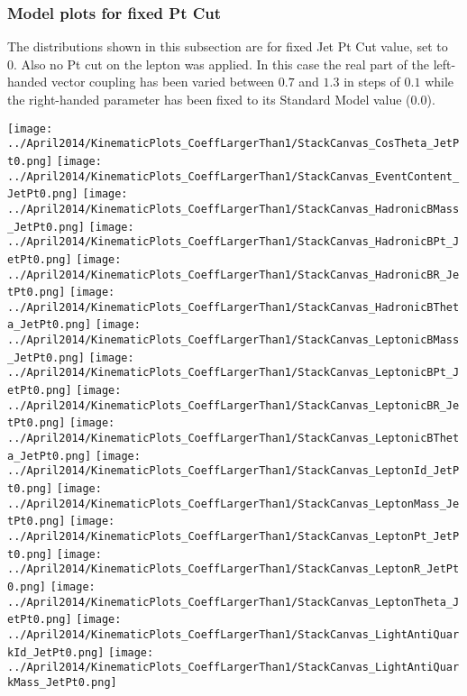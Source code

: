 \subsubsection{Model plots for fixed Pt Cut}
The distributions shown in this subsection are for fixed Jet Pt Cut value, set to 0. Also no Pt cut on the lepton was applied. In this case the real part of the left-handed vector coupling has been varied between $0.7$ and $1.3$ in steps of $0.1$ while the right-handed parameter has been fixed to its Standard Model value ($0.0$).
\begin{center}
\texttt{[image: ../April2014/KinematicPlots\_CoeffLargerThan1/StackCanvas\_CosTheta\_JetPt0.png]}
\texttt{[image: ../April2014/KinematicPlots\_CoeffLargerThan1/StackCanvas\_EventContent\_JetPt0.png]}
\texttt{[image: ../April2014/KinematicPlots\_CoeffLargerThan1/StackCanvas\_HadronicBMass\_JetPt0.png]}
\texttt{[image: ../April2014/KinematicPlots\_CoeffLargerThan1/StackCanvas\_HadronicBPt\_JetPt0.png]}
\texttt{[image: ../April2014/KinematicPlots\_CoeffLargerThan1/StackCanvas\_HadronicBR\_JetPt0.png]}
\texttt{[image: ../April2014/KinematicPlots\_CoeffLargerThan1/StackCanvas\_HadronicBTheta\_JetPt0.png]}
\texttt{[image: ../April2014/KinematicPlots\_CoeffLargerThan1/StackCanvas\_LeptonicBMass\_JetPt0.png]}
\texttt{[image: ../April2014/KinematicPlots\_CoeffLargerThan1/StackCanvas\_LeptonicBPt\_JetPt0.png]}
\texttt{[image: ../April2014/KinematicPlots\_CoeffLargerThan1/StackCanvas\_LeptonicBR\_JetPt0.png]}
\texttt{[image: ../April2014/KinematicPlots\_CoeffLargerThan1/StackCanvas\_LeptonicBTheta\_JetPt0.png]}
\texttt{[image: ../April2014/KinematicPlots\_CoeffLargerThan1/StackCanvas\_LeptonId\_JetPt0.png]}
\texttt{[image: ../April2014/KinematicPlots\_CoeffLargerThan1/StackCanvas\_LeptonMass\_JetPt0.png]}
\texttt{[image: ../April2014/KinematicPlots\_CoeffLargerThan1/StackCanvas\_LeptonPt\_JetPt0.png]}
\texttt{[image: ../April2014/KinematicPlots\_CoeffLargerThan1/StackCanvas\_LeptonR\_JetPt0.png]}
\texttt{[image: ../April2014/KinematicPlots\_CoeffLargerThan1/StackCanvas\_LeptonTheta\_JetPt0.png]}
\texttt{[image: ../April2014/KinematicPlots\_CoeffLargerThan1/StackCanvas\_LightAntiQuarkId\_JetPt0.png]}
\texttt{[image: ../April2014/KinematicPlots\_CoeffLargerThan1/StackCanvas\_LightAntiQuarkMass\_JetPt0.png]}

\end{center}
